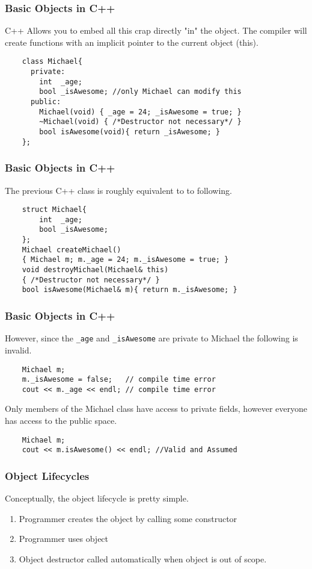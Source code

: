 \documentclass{beamer}
\begin{document}
\begin{frame}[fragile]
    \frametitle{Basic Objects in C++}
    C++ Allows you to embed all this crap directly "in" the object. The compiler will create functions with an implicit pointer to the current object (this).

    \begin{verbatim}
    class Michael{
      private:
        int  _age;
        bool _isAwesome; //only Michael can modify this
      public:
        Michael(void) { _age = 24; _isAwesome = true; }
        ~Michael(void) { /*Destructor not necessary*/ }
        bool isAwesome(void){ return _isAwesome; }
    };
    \end{verbatim}
\end{frame}

\begin{frame}[fragile]
    \frametitle{Basic Objects in C++}
    The previous C++ class is roughly equivalent to to following.
    \begin{verbatim}
    struct Michael{
        int  _age;
        bool _isAwesome; 
    };
    Michael createMichael() 
    { Michael m; m._age = 24; m._isAwesome = true; }
    void destroyMichael(Michael& this) 
    { /*Destructor not necessary*/ }
    bool isAwesome(Michael& m){ return m._isAwesome; }
    \end{verbatim}
\end{frame}

\begin{frame}[fragile]
    \frametitle{Basic Objects in C++}

    However, since the \texttt{\_age} and \texttt{\_isAwesome} are private to Michael the following is invalid.

    \begin{verbatim}
    Michael m;
    m._isAwesome = false;   // compile time error
    cout << m._age << endl; // compile time error
    \end{verbatim}

    Only members of the Michael class have access to private fields, however everyone has access to the public space.
    \begin{verbatim}
    Michael m;
    cout << m.isAwesome() << endl; //Valid and Assumed   
    \end{verbatim}
\end{frame}

\begin{frame}
    \frametitle{Object Lifecycles}
    Conceptually, the object lifecycle is pretty simple.
    \begin{enumerate}
        \item Programmer creates the object by calling some constructor
        \item Programmer uses object
        \item Object destructor called automatically when object is out of scope.
    \end{enumerate}
\end{frame}
\end{document}
